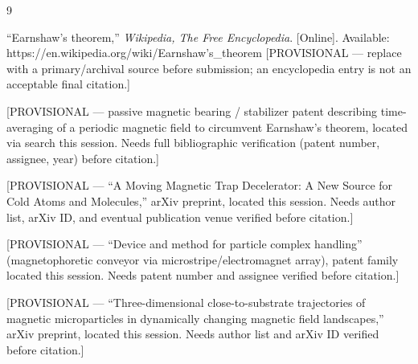 \documentclass[journal]{IEEEtran}
\begin{document}
\begin{thebibliography}{9}

``Earnshaw's theorem,'' \emph{Wikipedia, The Free Encyclopedia}. [Online].
Available: https://en.wikipedia.org/wiki/Earnshaw's\_theorem
[PROVISIONAL --- replace with a primary/archival source before submission;
an encyclopedia entry is not an acceptable final citation.]

[PROVISIONAL --- passive magnetic bearing / stabilizer patent describing
time-averaging of a periodic magnetic field to circumvent Earnshaw's
theorem, located via search this session. Needs full bibliographic
verification (patent number, assignee, year) before citation.]

[PROVISIONAL --- ``A Moving Magnetic Trap Decelerator: A New Source for
Cold Atoms and Molecules,'' arXiv preprint, located this session. Needs
author list, arXiv ID, and eventual publication venue verified before
citation.]

[PROVISIONAL --- ``Device and method for particle complex handling''
(magnetophoretic conveyor via microstripe/electromagnet array), patent
family located this session. Needs patent number and assignee verified
before citation.]

[PROVISIONAL --- ``Three-dimensional close-to-substrate trajectories of
magnetic microparticles in dynamically changing magnetic field
landscapes,'' arXiv preprint, located this session. Needs author list and
arXiv ID verified before citation.]

\end{thebibliography}
\end{document}
